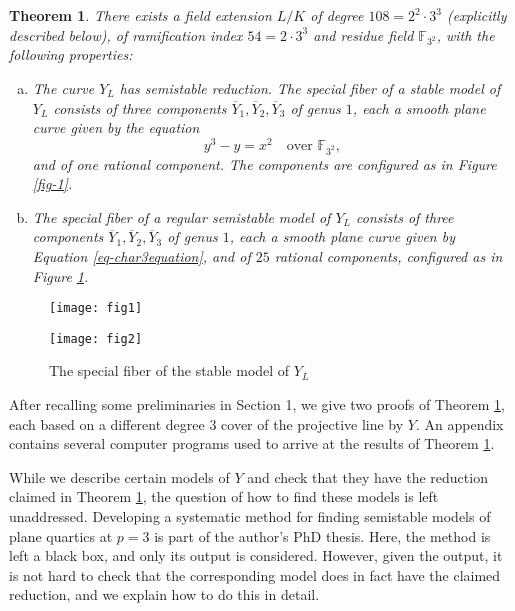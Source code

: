 \documentclass[11pt]{amsart}
\newcommand{\BF}{{\mathbb{F}}}
\newtheorem{Satz}[Prin]{Theorem}
\theoremstyle{definition}
\begin{document}
\begin{Satz}
\label{theresult}
There exists a field extension $L/K$ of degree $108=2^2\cdot3^3$ (explicitly described below), of ramification index $54=2\cdot3^3$ and residue field $\BF_{3^2}$, with the following properties:
\begin{enumerate}[(a)]
\item The curve $Y_L$ has semistable reduction. The special fiber of a stable model of $Y_L$ consists of three components $\overline{Y}_1,\overline{Y}_2,\overline{Y}_3$ of genus $1$, each a smooth plane curve given by the equation
\begin{equation}\label{eq-char3equation}
y^3-y=x^2\quad\text{over $\BF_{3^2}$},
\end{equation}
and of one rational component. The components are configured as in Figure \ref{fig-1}.
\item The special fiber of a regular semistable model of $Y_L$ consists of three components $\overline{Y}_1,\overline{Y}_2,\overline{Y}_3$ of genus $1$, each a smooth plane curve given by Equation \eqref{eq-char3equation}, and of $25$ rational components, configured as in Figure \ref{fig-2}.
\end{enumerate}
\end{Satz}


\begin{figure}[!htb]
\centering
\begin{minipage}{.5\textwidth}
\centering
\texttt{[image: fig1]}
\caption{The special fiber of the stable model of $Y_L$}
\label{fig-1}
\end{minipage}%
\begin{minipage}{.5\textwidth}
\centering
\texttt{[image: fig2]}
\label{fig-2}
\end{minipage}
\end{figure}

After recalling some preliminaries in Section 1, we give two proofs of Theorem \ref{theresult}, each based on a different degree $3$ cover of the projective line by $Y$. An appendix contains several computer programs used to arrive at the results of Theorem \ref{theresult}.

While we describe certain models of $Y$ and check that they have the reduction claimed in Theorem \nolinebreak \ref{theresult}, the question of how to find these models is left unaddressed. Developing a systematic method for finding semistable models of plane quartics at $p=3$ is part of the author's PhD thesis. Here, the method is left a black box, and only its output is considered. However, given the output, it is not hard to check that the corresponding model does in fact have the claimed reduction, and we explain how to do this in detail.
\end{document}
